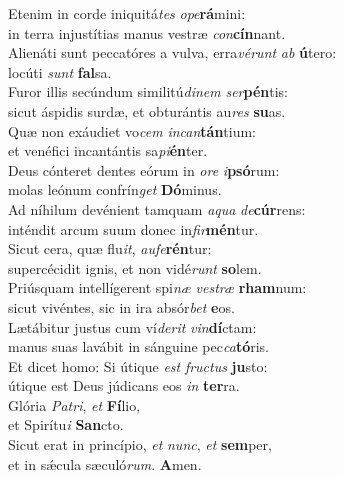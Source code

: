 \evenverse Etenim in corde iniquitá\textit{tes} \textit{o}\textit{pe}\textbf{rá}mini:~\*\\
\evenverse in terra injustítias manus vestræ \textit{con}\textbf{cín}nant.\\
\oddverse Alienáti sunt peccatóres a vulva, erra\textit{vé}\textit{runt} \textit{ab} \textbf{ú}tero:~\*\\
\oddverse locúti \textit{sunt} \textbf{fal}sa.\\
\evenverse Furor illis secúndum similitú\textit{di}\textit{nem} \textit{ser}\textbf{pén}tis:~\*\\
\evenverse sicut áspidis surdæ, et obturántis au\textit{res} \textbf{su}as.\\
\oddverse Quæ non exáudiet vo\textit{cem} \textit{in}\textit{can}\textbf{tán}tium:~\*\\
\oddverse et venéfici incantántis sa\textit{pi}\textbf{én}ter.\\
\evenverse Deus cónteret dentes eórum in \textit{o}\textit{re} \textit{i}\textbf{psó}rum:~\*\\
\evenverse molas leónum confrín\textit{get} \textbf{Dó}minus.\\
\oddverse Ad níhilum devénient tamquam \textit{a}\textit{qua} \textit{de}\textbf{cúr}rens:~\*\\
\oddverse inténdit arcum suum donec in\textit{fir}\textbf{mén}tur.\\
\evenverse Sicut cera, quæ flu\textit{it}, \textit{au}\textit{fe}\textbf{rén}tur:~\*\\
\evenverse supercécidit ignis, et non vidé\textit{runt} \textbf{so}lem.\\
\oddverse Priúsquam intellígerent spi\textit{næ} \textit{ve}\textit{stræ} \textbf{rham}num:~\*\\
\oddverse sicut vivéntes, sic in ira absór\textit{bet} \textbf{e}os.\\
\evenverse Lætábitur justus cum ví\textit{de}\textit{rit} \textit{vin}\textbf{dí}ctam:~\*\\
\evenverse manus suas lavábit in sánguine pec\textit{ca}\textbf{tó}ris.\\
\oddverse Et dicet homo: Si útique \textit{est} \textit{fru}\textit{ctus} \textbf{ju}sto:~\*\\
\oddverse útique est Deus júdicans eos \textit{in} \textbf{ter}ra.\\
\evenverse Glória \textit{Pa}\textit{tri}, \textit{et} \textbf{Fí}lio,~\*\\
\evenverse et Spirítu\textit{i} \textbf{San}cto.\\
\oddverse Sicut erat in princípio, \textit{et} \textit{nunc}, \textit{et} \textbf{sem}per,~\*\\
\oddverse et in sǽcula sæculó\textit{rum}. \textbf{A}men.\\
